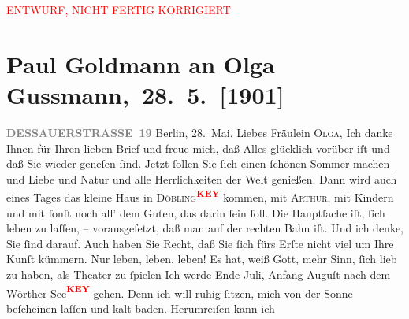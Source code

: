 
\begin{center}
            \textcolor{red}{ENTWURF, NICHT FERTIG KORRIGIERT}
                      \end{center}
            
         
         \renewcommand{\erwaehntePersonen}{Personen: Olga Schnitzler}
         \renewcommand{\erwaehnteOrte}{Orte: Berlin, Wien}
         \renewcommand{\erwaehnteWerke}{}
               \section[ Paul Goldmann an Olga Gussmann, 28. 5. {[}1901{]}]{ Paul Goldmann an Olga Gussmann, 28. 5. {[}1901{]}}\nopagebreak{}\rehead{ }\begin{ledgroupsized}[t]{13cm}\normalsize\beginnumbering \toendnotes[C]{\smallbreak\pagebreak[2]} 
\pstart
           \noindent{}\raggedleft{}{\pb}\textcolor{gray}{\textbf{DESSAUERSTRASSE 19}}\pend
           \pstart
           Berlin, 28. Mai.\pend
           \pstart\center{}Liebes Fräulein \textsc{Olga},\pend\pstart
           Ich danke Ihnen für Ihren lieben Brief und freue mich, daß Alles glücklich vorüber
               iſt und daß Sie wieder geneſen ſind. Jetzt ſollen Sie ſich einen ſchönen Sommer
               machen und Liebe und Natur und alle Herrlichkeiten der Welt genießen. Dann wird auch
               eines Tages das kleine Haus in \textsc{Döbling\textcolor{red}{\textsuperscript{\textbf{KEY}}}} kommen, mit \textsc{Arthur}, mit Kindern und mit {\pb}
               ſonſt noch all’ dem Guten, das darin ſein ſoll. Die Hauptſache iſt, ſich leben zu
               laſſen, – vorausgeſetzt, daß man auf der rechten Bahn iſt. Und ich denke, Sie ſind
               darauf.\pend
           \pstart
           Auch haben Sie Recht, daß Sie ſich fürs Erſte nicht viel um Ihre Kunſt kümmern. Nur
               leben, leben, leben! Es hat, weiß Gott, mehr Sinn, ſich lieb zu haben, als Theater zu
               ſpielen{\dotsfive}\pend
           \pstart
           Ich werde Ende Juli, Anfang Auguſt nach dem Wörther See\textcolor{red}{\textsuperscript{\textbf{KEY}}}{\pb} gehen. Denn ich will ruhig
               ſitzen, mich von der Sonne beſcheinen laſſen und kalt baden. Herumreiſen kann ich

\end{ledgroupsized}
